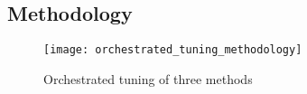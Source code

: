 \subsection{Methodology} \label{sec:orc_meth}

\begin{figure}[H]
	\centering
	\texttt{[image: orchestrated\_tuning\_methodology]}
	\caption{Orchestrated tuning of three methods}
	\label{fig:orc_tun_struct}
\end{figure}

